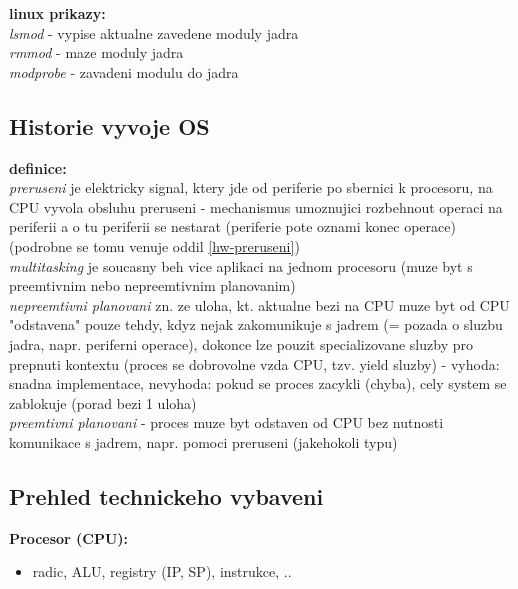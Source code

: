 \documentclass[a4paper, 11pt]{article}
\begin{document}
\noindent\textbf{linux prikazy:} \\[0.5em]
\textit{lsmod} - vypise aktualne zavedene moduly jadra \\[0.2em]
\textit{rmmod} - maze moduly jadra \\[0.2em]
\textit{modprobe} - zavadeni modulu do jadra \\[0.2em]

\newpage

\subsection{Historie vyvoje OS}

\noindent\textbf{definice:} \\[0.5em] \label{hist-preruseni}
\textit{preruseni} je elektricky signal, ktery jde od periferie po sbernici k procesoru, na CPU vyvola obsluhu preruseni - mechanismus umoznujici rozbehnout operaci na periferii a o tu periferii se nestarat (periferie pote oznami konec operace) (podrobne se tomu venuje oddil \ref{hw-preruseni}) \\[0.2em]
\textit{multitasking} je soucasny beh vice aplikaci na jednom procesoru (muze byt s preemtivnim nebo nepreemtivnim planovanim) \\[0.2em]
\textit{nepreemtivni planovani} zn. ze uloha, kt. aktualne bezi na CPU muze byt od CPU "odstavena" pouze tehdy, kdyz nejak zakomunikuje s jadrem (= pozada o sluzbu jadra, napr. periferni operace), dokonce lze pouzit specializovane sluzby pro prepnuti kontextu (proces se dobrovolne vzda CPU, tzv. yield sluzby) - vyhoda: snadna implementace, nevyhoda: pokud se proces zacykli (chyba), cely system se zablokuje (porad bezi 1 uloha) \\[0.2em]
\textit{preemtivni planovani} - proces muze byt odstaven od CPU bez nutnosti komunikace s jadrem, napr. pomoci preruseni (jakehokoli typu) \\[1em]

\subsection{Prehled technickeho vybaveni}

\noindent\textbf{Procesor (CPU):}
\begin{itemize}
    \item radic, ALU, registry (IP, SP), instrukce, .. \\
\end{itemize}
\end{document}
